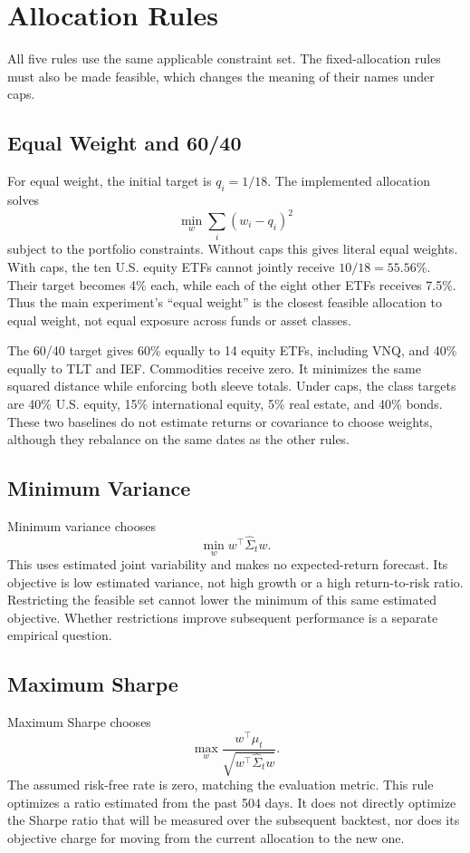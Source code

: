\documentclass[conference]{IEEEtran}
\begin{document}
\section{Allocation Rules}
All five rules use the same applicable constraint set. The fixed-allocation rules must also be made feasible, which changes the meaning of their names under caps.

\subsection{Equal Weight and 60/40}
For equal weight, the initial target is $q_i=1/18$. The implemented allocation solves
\begin{equation}
 \min_w\sum_i(w_i-q_i)^2
 \label{eq:projection}
\end{equation}
subject to the portfolio constraints. Without caps this gives literal equal weights. With caps, the ten U.S. equity ETFs cannot jointly receive $10/18=55.56\%$. Their target becomes 4\% each, while each of the eight other ETFs receives 7.5\%. Thus the main experiment's ``equal weight'' is the closest feasible allocation to equal weight, not equal exposure across funds or asset classes.

The 60/40 target gives 60\% equally to 14 equity ETFs, including VNQ, and 40\% equally to TLT and IEF. Commodities receive zero. It minimizes the same squared distance while enforcing both sleeve totals. Under caps, the class targets are 40\% U.S. equity, 15\% international equity, 5\% real estate, and 40\% bonds. These two baselines do not estimate returns or covariance to choose weights, although they rebalance on the same dates as the other rules.

\subsection{Minimum Variance}
Minimum variance chooses
\begin{equation}
 \min_w w^\top\widehat\Sigma_t w.
\end{equation}
This uses estimated joint variability and makes no expected-return forecast. Its objective is low estimated variance, not high growth or a high return-to-risk ratio. Restricting the feasible set cannot lower the minimum of this same estimated objective. Whether restrictions improve subsequent performance is a separate empirical question.

\subsection{Maximum Sharpe}
Maximum Sharpe chooses
\begin{equation}
 \max_w\frac{w^\top\widehat\mu_t}
 {\sqrt{w^\top\widehat\Sigma_t w}}.
\end{equation}
The assumed risk-free rate is zero, matching the evaluation metric. This rule optimizes a ratio estimated from the past 504 days. It does not directly optimize the Sharpe ratio that will be measured over the subsequent backtest, nor does its objective charge for moving from the current allocation to the new one.
\end{document}
